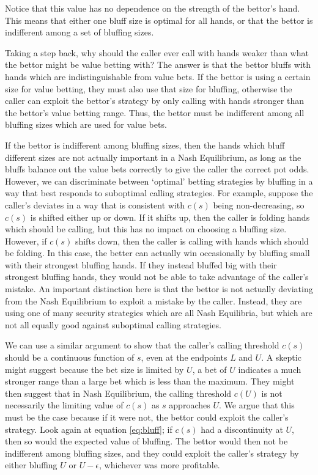 \documentclass[a4paper,12pt]{article}
\theoremstyle{plain}
\theoremstyle{definition}
\begin{document}
Notice that this value has no dependence on the strength of the bettor's hand. This means that either one bluff size is optimal for all hands, or that the bettor is indifferent among a set of bluffing sizes. 

Taking a step back, why should the caller ever call with hands weaker than what the bettor might be value betting with? The answer is that the bettor bluffs with hands which are indistinguishable from value bets. If the bettor is using a certain size for value betting, they must also use that size for bluffing, otherwise the caller can exploit the bettor's strategy by only calling with hands stronger than the bettor's value betting range. Thus, the bettor must be indifferent among all bluffing sizes which are used for value bets.

If the bettor is indifferent among bluffing sizes, then the hands which bluff different sizes are not actually important in a Nash Equilibrium, as long as the bluffs balance out the value bets correctly to give the caller the correct pot odds. However, we can discriminate between `optimal' betting strategies by bluffing in a way that best responds to suboptimal calling strategies. For example, suppose the caller's deviates in a way that is consistent with $c(s)$ being non-decreasing, so $c(s)$ is shifted either up or down. If it shifts up, then the caller is folding hands which should be calling, but this has no impact on choosing a bluffing size. However, if $c(s)$ shifts down, then the caller is calling with hands which should be folding. In this case, the better can actually win occasionally by bluffing small with their strongest bluffing hands. If they instead bluffed big with their strongest bluffing hands, they would not be able to take advantage of the caller's mistake. An important distinction here is that the bettor is not actually deviating from the Nash Equilibrium to exploit a mistake by the caller. Instead, they are using one of many security strategies which are all Nash Equilibria, but which are not all equally good against suboptimal calling strategies. 

We can use a similar argument to show that the caller's calling threshold $c(s)$ should be a continuous function of $s$, even at the endpoints $L$ and $U$. A skeptic might suggest because the bet size is limited by $U$, a bet of $U$ indicates a much stronger range than a large bet which is less than the maximum. They might then suggest that in Nash Equilibrium, the calling threshold $c(U)$ is not necessarily the limiting value of $c(s)$ as $s$ approaches $U$. We argue that this must be the case because if it were not, the bettor could exploit the caller's strategy. Look again at equation \ref{eq:bluff}; if $c(s)$ had a discontinuity at $U$, then so would the expected value of bluffing. The bettor would then not be indifferent among bluffing sizes, and they could exploit the caller's strategy by either bluffing $U$ or $U-\epsilon$, whichever was more profitable.\\
\end{document}
